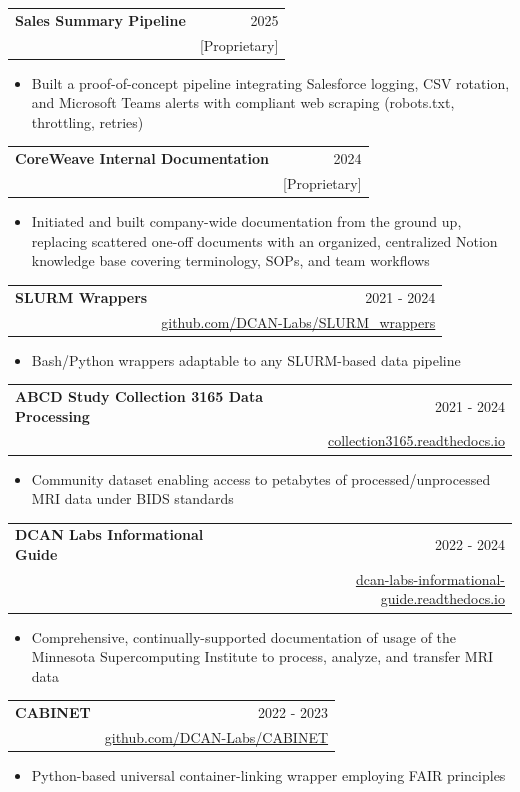 \documentclass[a4paper,11pt]{article}
\makeatletter
\newcommand{\resumeProject}[4]{
\vspace{3mm}\item[]
    \begin{tabular*}{\textwidth}[t]{l@{\extracolsep{\fill}}r}
        \hspace{-4.4mm} \small\textbf{#1} \vspace{0mm} & {\footnotesize{#3}}\vspace{-1mm}\\
        \hspace{-4.3mm} \footnotesize{\text{#2}}\vspace{2mm} & \footnotesize{#4} \vspace{0mm}
    \end{tabular*}
    \vspace{-6mm}
}
\newcommand{\resumeItemListStart}{\begin{justify}\begin{itemize}[leftmargin=3ex, rightmargin=2ex, noitemsep,labelsep=1.2mm,itemsep=0mm]\small}
\newcommand{\resumeItemListEnd}{\end{itemize}\end{justify}\vspace{-1.5mm}}
\makeatother
\begin{document}
\resumeProject
{Sales Summary Pipeline} 
{Independent Automation Project} 
{2025} 
{[Proprietary]}
\resumeItemListStart
\item[$\bullet$] Built a proof-of-concept pipeline integrating Salesforce logging, CSV rotation, and Microsoft Teams alerts with compliant web scraping (robots.txt, throttling, retries)
\resumeItemListEnd


\resumeProject
{CoreWeave Internal Documentation} 
{CoreWeave, Inc.} 
{2024} 
{[Proprietary]}
\resumeItemListStart
\item[$\bullet$] Initiated and built company-wide documentation from the ground up, replacing scattered one-off documents with an organized, centralized Notion knowledge base covering terminology, SOPs, and team workflows
\resumeItemListEnd


\resumeProject
{SLURM Wrappers} 
{High-Performance Computing S3 and Disk SLURM-Compliant Wrappers} 
{2021 - 2024} 
{\href{https://github.com/DCAN-Labs/SLURM_wrappers}{github.com/DCAN-Labs/SLURM\_wrappers}}
\resumeItemListStart
\item[$\bullet$] Bash/Python wrappers adaptable to any SLURM-based data pipeline
\resumeItemListEnd

\resumeProject
{ABCD Study Collection 3165 Data Processing} 
{NIH Data Archive (NDA)} 
{2021 - 2024} 
{\href{https://collection3165.readthedocs.io/en/stable/}{collection3165.readthedocs.io}}
\resumeItemListStart
\item[$\bullet$] Community dataset enabling access to petabytes of processed/unprocessed MRI data under BIDS standards
\resumeItemListEnd


\resumeProject
{DCAN Labs Informational Guide} %
{Minnesota Supercomputing Institute Data Engineering Documentation} %
{2022 - 2024} %
{\href{https://dcan-labs-informational-guide.readthedocs.io/en/latest/}{dcan-labs-informational-guide.readthedocs.io}} %
\resumeItemListStart
\item[$\bullet$] Comprehensive, continually-supported documentation of usage of the Minnesota Supercomputing Institute to process, analyze, and transfer MRI data
\resumeItemListEnd

\resumeProject
{CABINET} %
{Container-Linking Wrapper} %
{2022 - 2023} %
{\href{https://github.com/DCAN-Labs/CABINET}{github.com/DCAN-Labs/CABINET}} %
\resumeItemListStart
\item[$\bullet$] Python-based universal container-linking wrapper employing FAIR principles
\resumeItemListEnd
\end{document}

